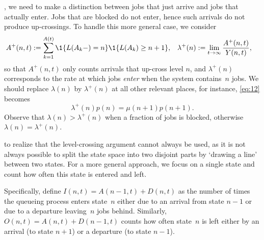 \documentclass[stochastic-or.tex]{subfiles}
\begin{document}
, we need to make a distinction between jobs that just arrive and jobs that actually enter.
Jobs that are blocked do not enter, hence such arrivals do not produce up-crossings.
To handle this more general case, we consider
\begin{align}\label{eq:102}
A^{+}(n,t) &:=  \sum_{k=1}^{A(t)} \1{L(A_k-) = n}\1{\L(A_k) \geq  n+1}, &
\lambda^{+}(n) &:= \lim_{t\to\infty} \frac{A^{+}(n,t)}{Y(n,t)},
 \end{align}
 so that $A^{+}(n,t)$ only counts arrivals that up-cross level $n$, and $\lambda^{+}(n)$ corresponds to the rate at which jobs \emph{enter} when the system contains~$n$ jobs.
We should replace $\lambda(n)$ by $\lambda^{+}(n)$ at all other relevant places, for instance, \cref{eq:12} becomes
\begin{equation*}
\lambda^{+}(n) p(n) = \mu(n+1) p(n+1).
\end{equation*}
Observe that $\lambda(n) > \lambda^{+}(n)$ when a fraction of jobs is blocked, otherwise $\lambda(n) = \lambda^{+}(n)$.

 to realize that the level-crossing argument cannot always be used, as it is not always possible to split the state space into two disjoint parts by `drawing a line' between two states.
For a more general approach, we focus on a single state and count how often this state is entered and left.
\begin{marginfigure}
\end{marginfigure}
Specifically, define $I(n,t) = A(n-1,t) + D(n,t)$ as the number of times the queueing process enters state~$n$ either due to an arrival from state $n-1$ or due to a departure leaving~$n$ jobs behind. Similarly,  $O(n,t) = A(n,t) + D(n-1,t)$ counts how often state~$n$ is left either by an arrival (to state $n+1$) or a departure (to state $n-1$).
\end{document}
